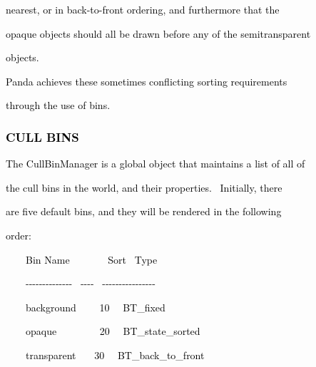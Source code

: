 \documentclass[a4paper]{article}
\newcommand\textstyleOOoComputerKeyWord[1]{\textrm{\textcolor[rgb]{0.0,0.0,0.5019608}{#1}}}
\begin{document}
{\color{black}
\textstyleOOoComputerKeyWord{\textcolor{black}{nearest, or in {\textquotedbl}back-to-front{\textquotedbl} ordering, and
furthermore that the}}}

{\color{black}
\textstyleOOoComputerKeyWord{\textcolor{black}{opaque objects should all be drawn before any of the semitransparent}}}

{\color{black}
\textstyleOOoComputerKeyWord{\textcolor{black}{objects.}}}

{\color{black}
\textstyleOOoComputerKeyWord{\textcolor{black}{Panda achieves these sometimes conflicting sorting requirements}}}

{\color{black}
\textstyleOOoComputerKeyWord{\textcolor{black}{through the use of bins.}}}

\subsubsection[CULL BINS]{\textstyleOOoComputerKeyWord{\textcolor{black}{CULL BINS}}}
\hypertarget{RefHeading7733869075401}{}
\bigskip

{\color{black}
\textstyleOOoComputerKeyWord{\textcolor{black}{The CullBinManager is a global object that maintains a list of all of}}}

{\color{black}
\textstyleOOoComputerKeyWord{\textcolor{black}{the cull bins in the world, and their properties. \ Initially, there}}}

{\color{black}
\textstyleOOoComputerKeyWord{\textcolor{black}{are five default bins, and they will be rendered in the following}}}

{\color{black}
\textstyleOOoComputerKeyWord{\textcolor{black}{order:}}}


\bigskip

{\color{black}
\textstyleOOoComputerKeyWord{\textcolor{black}{\ \ \ \ Bin Name \ \ \ \ \ \ \ Sort \ Type}}}

{\color{black}
\textstyleOOoComputerKeyWord{\textcolor{black}{\ \ \ \ {}-{}-{}-{}-{}-{}-{}-{}-{}-{}-{}-{}-{}-{}- \ {}-{}-{}-{}-
\ {}-{}-{}-{}-{}-{}-{}-{}-{}-{}-{}-{}-{}-{}-{}-{}-}}}

{\color{black}
\textstyleOOoComputerKeyWord{\textcolor{black}{\ \ \ \ {\textquotedbl}background{\textquotedbl} \ \ \ \ 10
\ \ BT\_fixed}}}

{\color{black}
\textstyleOOoComputerKeyWord{\textcolor{black}{\ \ \ \ {\textquotedbl}opaque{\textquotedbl} \ \ \ \ \ \ \ \ 20
\ \ BT\_state\_sorted}}}

{\color{black}
\textstyleOOoComputerKeyWord{\textcolor{black}{\ \ \ \ {\textquotedbl}transparent{\textquotedbl} \ \ \ 30
\ \ BT\_back\_to\_front}}}
\end{document}
